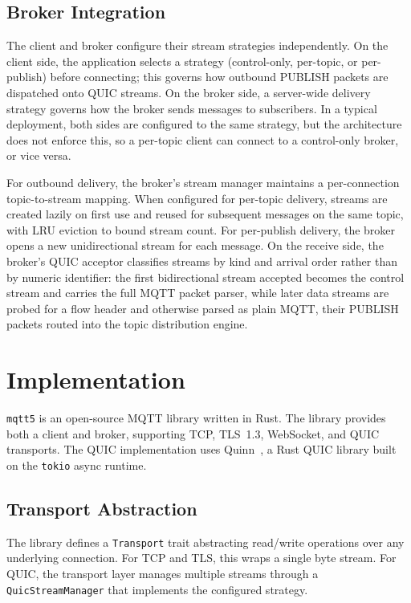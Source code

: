 \documentclass[a4paper,fleqn]{cas-dc}
\begin{document}
\subsection{Broker Integration}

The client and broker configure their stream strategies independently. On the client side, the application selects a strategy (control-only, per-topic, or per-publish) before connecting; this governs how outbound PUBLISH packets are dispatched onto QUIC streams. On the broker side, a server-wide delivery strategy governs how the broker sends messages to subscribers. In a typical deployment, both sides are configured to the same strategy, but the architecture does not enforce this, so a per-topic client can connect to a control-only broker, or vice versa.

For outbound delivery, the broker's stream manager maintains a per-connection topic-to-stream mapping. When configured for per-topic delivery, streams are created lazily on first use and reused for subsequent messages on the same topic, with LRU eviction to bound stream count. For per-publish delivery, the broker opens a new unidirectional stream for each message. On the receive side, the broker's QUIC acceptor classifies streams by kind and arrival order rather than by numeric identifier: the first bidirectional stream accepted becomes the control stream and carries the full MQTT packet parser, while later data streams are probed for a flow header and otherwise parsed as plain MQTT, their PUBLISH packets routed into the topic distribution engine.


\section{Implementation}
\label{sec:implementation}

\texttt{mqtt5} is an open-source MQTT library written in Rust. The library provides both a client and broker, supporting TCP, TLS~1.3, WebSocket, and QUIC transports. The QUIC implementation uses Quinn~\cite{quinn}, a Rust QUIC library built on the \texttt{tokio} async runtime.

\subsection{Transport Abstraction}

The library defines a \texttt{Transport} trait abstracting read/write operations over any underlying connection. For TCP and TLS, this wraps a single byte stream. For QUIC, the transport layer manages multiple streams through a \texttt{QuicStreamManager} that implements the configured strategy.
\end{document}
